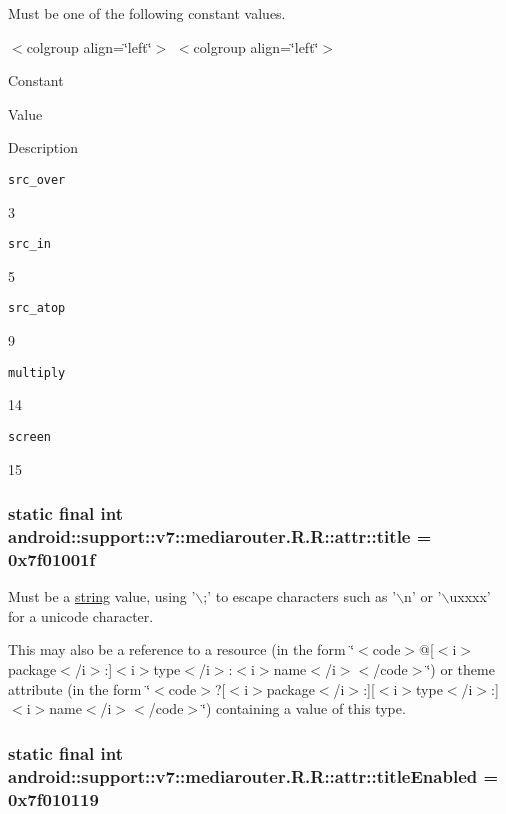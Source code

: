 Must be one of the following constant values. \begin{TabularC}{0}
\hline
\end{TabularC}
$<$colgroup align=\char`\"{}left\char`\"{}$>$ $<$colgroup align=\char`\"{}left\char`\"{}$>$ 

Constant

Value

Description 

{\tt src\_\-over}

3

{\tt src\_\-in}

5

{\tt src\_\-atop}

9

{\tt multiply}

14

{\tt screen}

15\hypertarget{classandroid_1_1support_1_1v7_1_1mediarouter_1_1_r_1_1attr_bf9a91722acc2c198831902773aba8e0}{
\subsubsection[{title}]{\setlength{\rightskip}{0pt plus 5cm}static final int android::support::v7::mediarouter.R.R::attr::title = 0x7f01001f}}
\label{classandroid_1_1support_1_1v7_1_1mediarouter_1_1_r_1_1attr_bf9a91722acc2c198831902773aba8e0}


Must be a \hyperlink{classandroid_1_1support_1_1v7_1_1mediarouter_1_1_r_1_1string}{string} value, using '$\backslash$;' to escape characters such as '$\backslash$n' or '$\backslash$uxxxx' for a unicode character. 

This may also be a reference to a resource (in the form \char`\"{}$<$code$>$@\mbox{[}$<$i$>$package$<$/i$>$:\mbox{]}$<$i$>$type$<$/i$>$:$<$i$>$name$<$/i$>$$<$/code$>$\char`\"{}) or theme attribute (in the form \char`\"{}$<$code$>$?\mbox{[}$<$i$>$package$<$/i$>$:\mbox{]}\mbox{[}$<$i$>$type$<$/i$>$:\mbox{]}$<$i$>$name$<$/i$>$$<$/code$>$\char`\"{}) containing a value of this type. \hypertarget{classandroid_1_1support_1_1v7_1_1mediarouter_1_1_r_1_1attr_74f4ff2dd78bdf08eac3fd84b0c50178}{
\subsubsection[{titleEnabled}]{\setlength{\rightskip}{0pt plus 5cm}static final int android::support::v7::mediarouter.R.R::attr::titleEnabled = 0x7f010119}}
\label{classandroid_1_1support_1_1v7_1_1mediarouter_1_1_r_1_1attr_74f4ff2dd78bdf08eac3fd84b0c50178}


